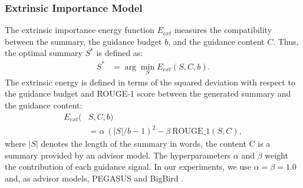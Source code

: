 \documentclass[11pt,table]{article}
\begin{document}
\subsubsection{Extrinsic Importance Model}
\label{sec:extrinsic_importance}
The extrinsic importance energy function $E_{ext}$ measures the compatibility between the summary, the guidance budget $b$, and the guidance content $C$. Thus, the optimal summary $S^*$ is defined as:
\begin{align}
S^* &= \arg\min_{S} E_{ext}(S,C,b).
\end{align}
The extrinsic energy is defined in terms of the squared deviation with respect to the guidance budget and ROUGE-1 score between the generated summary and the guidance content:
\begin{align} \label{eq:extrinsic_energy}
E_{ext}(&S,C,b) \\ \nonumber
    &= \alpha\ (|S| / b - 1)^2 - \beta\  \mathrm{ROUGE\text{\_}1}(S, C),
\end{align}
where $|S|$ denotes the length of the summary in words, the content C is a summary provided by an advisor model. The hyperparameters $\alpha$ and $\beta$ weight the contribution of each guidance signal. In our experiments, we use $\alpha=\beta=1.0$ and, as advisor models, PEGASUS \citep{zhang2020pegasus} and BigBird \citep{zaheer2020big}.
\end{document}

